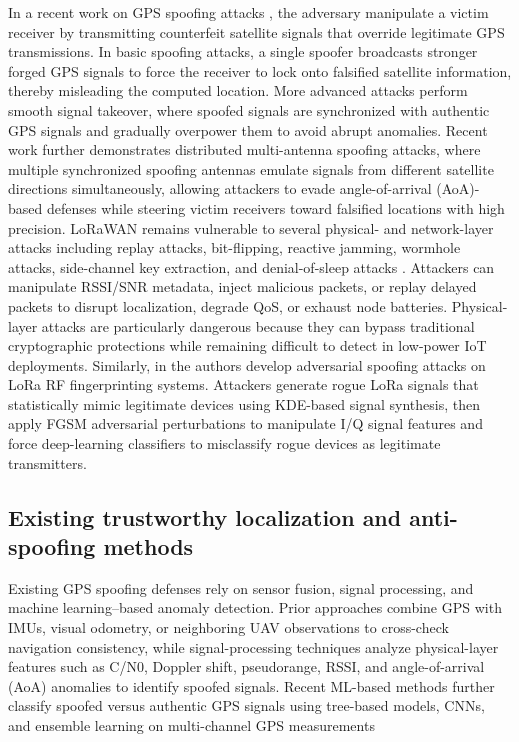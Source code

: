 \documentclass[10pt, twocolumn, letterpaper]{article}
\begin{document}
In a recent work on GPS spoofing attacks \cite{wisec1}, the adversary manipulate a victim receiver by transmitting counterfeit satellite signals that override legitimate GPS transmissions. In basic spoofing attacks, a single spoofer broadcasts stronger forged GPS signals to force the receiver to lock onto falsified satellite information, thereby misleading the computed location. More advanced attacks perform smooth signal takeover, where spoofed signals are synchronized with authentic GPS signals and gradually overpower them to avoid abrupt anomalies. Recent work further demonstrates distributed multi-antenna spoofing attacks, where multiple synchronized spoofing antennas emulate signals from different satellite directions simultaneously, allowing attackers to evade angle-of-arrival (AoA)-based defenses while steering victim receivers toward falsified locations with high precision.
LoRaWAN remains vulnerable to several physical- and network-layer attacks including replay attacks, bit-flipping, reactive jamming, wormhole attacks, side-channel key extraction, and denial-of-sleep attacks \cite{lorawanattack}. Attackers can manipulate RSSI/SNR metadata, inject malicious packets, or replay delayed packets to disrupt localization, degrade QoS, or exhaust node batteries. Physical-layer attacks are particularly dangerous because they can bypass traditional cryptographic protections while remaining difficult to detect in low-power IoT deployments. Similarly, in \cite{arxiv} the authors develop adversarial spoofing attacks on LoRa RF fingerprinting systems. Attackers generate rogue LoRa signals that statistically mimic legitimate devices using KDE-based signal synthesis, then apply FGSM adversarial perturbations to manipulate I/Q signal features and force deep-learning classifiers to misclassify rogue devices as legitimate transmitters.

\subsection{Existing trustworthy localization and anti-spoofing methods}
Existing GPS spoofing defenses rely on sensor fusion, signal processing, and machine learning–based anomaly detection. Prior approaches combine GPS with IMUs, visual odometry, or neighboring UAV observations to cross-check navigation consistency, while signal-processing techniques analyze physical-layer features such as C/N0, Doppler shift, pseudorange, RSSI, and angle-of-arrival (AoA) anomalies to identify spoofed signals. Recent ML-based methods further classify spoofed versus authentic GPS signals using tree-based models, CNNs, and ensemble learning on multi-channel GPS measurements \cite{gpsecurity}
\end{document}
